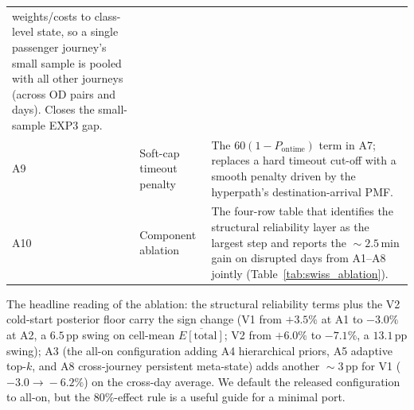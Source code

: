 \documentclass[opre,dblanonrev]{informs4}
\begin{document}
\begin{APPENDICES}
\begin{table}
{\begin{tabular}{l p{3.4cm} p{5.6cm}}
weights/costs to class-level state, so a single passenger journey's
small sample is pooled with all other journeys (across OD pairs and
days). Closes the small-sample EXP3 gap. \\
A9 & Soft-cap timeout penalty & The $60(1-P_{\text{ontime}})$ term
in A7; replaces a hard timeout cut-off with a smooth penalty driven
by the hyperpath's destination-arrival PMF. \\
A10 & Component ablation     & The four-row table that identifies the
structural reliability layer as the largest step and reports the
$\!\sim\!2.5$\,min gain on
disrupted days from A1--A8 jointly (Table~\ref{tab:swiss_ablation}). \\
\bottomrule
\end{tabular}}
{}
\end{table}

The headline reading of the ablation: the structural reliability
terms plus the V2 cold-start posterior floor carry the sign change
(V1 from $+3.5\%$ at A1 to $-3.0\%$
at A2, a $6.5$\,pp swing on cell-mean $\overline{E[\mathrm{total}]}$;
V2 from $+6.0\%$ to $-7.1\%$, a $13.1$\,pp swing); A3 (the all-on
configuration adding A4 hierarchical priors, A5 adaptive top-$k$,
and A8 cross-journey persistent meta-state) adds another
$\!\sim\!3$\,pp for V1 ($-3.0\!\to\!-6.2\%$) on the cross-day
average. We default the
released configuration to all-on, but the
$80\%$-effect rule is a useful guide for a minimal port.

\FloatBarrier
\end{APPENDICES}


\end{document}
